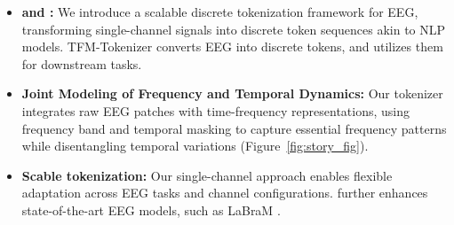 \begin{itemize}[left=0pt]
    \item \textbf{\tokenizer and \encoder:} We introduce a scalable discrete tokenization framework for EEG, transforming single-channel signals into discrete token sequences akin to NLP models. TFM-Tokenizer converts EEG into discrete tokens, and \encoder utilizes them for downstream tasks.
    

    \item \textbf{Joint Modeling of Frequency and Temporal Dynamics:} Our tokenizer integrates raw EEG patches with time-frequency representations, using frequency band and temporal masking to capture essential frequency patterns while disentangling temporal variations (Figure~\ref{fig:story_fig}). 
    

    \item \textbf{Scable tokenization:} Our single-channel approach enables flexible adaptation across EEG tasks and channel configurations. \tokenizer further enhances state-of-the-art EEG models, such as LaBraM \cite{jiang2024large}.



\end{itemize}
